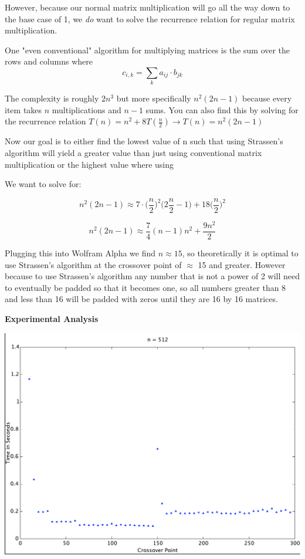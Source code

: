 \documentclass[12pt]{article}
\begin{document}
\noindent However, because our normal matrix multiplication will go all the way down to the base case of 1, we \emph{do} want to solve the recurrence relation for regular matrix multiplication.  
\medskip

\noindent One "even conventional" algorithm for multiplying matrices is the sum over the rows and columns where 
$$c_{i,k} = \sum_k a_{ij} \cdot b_{jk}$$

\noindent The complexity is roughly $2n^3$ but more specifically $n^2(2n-1)$ because every item takes $n$ multiplications and $n-1$ sums.  You can also find this by solving for the recurrence relation $T(n) = n^2 + 8T(\frac{n}{2}) \to T(n) = n^2(2n-1)$
\bigskip

\noindent Now our goal is to either find the lowest value of n such that using Strassen's algorithm will yield a greater value than just using conventional matrix multiplication or the highest value where using 
\medskip

\noindent We want to solve for:

$$n^2(2n-1) \approx 7 \cdot \bigg( \frac{n}{2}\bigg)^2\bigg(2\frac{n}{2}-1\bigg) + 18\bigg( \frac{n}{2}\bigg)^2$$

$$n^2(2n-1) \approx \frac{7}{4}(n-1)n^2 + \frac{9n^2}{2}$$

\smallskip
\noindent Plugging this into Wolfram Alpha we find $n\approx15$, so theoretically it is optimal to use Strassen's algorithm at the crossover point of $\approx$ 15 and greater.  However because to use Strassen's algorithm any number that is not a power of 2 will need to eventually be padded so that it becomes one, so all numbers greater than 8 and less than 16 will be padded with zeros until they are 16 by 16 matrices.

\bigskip

\noindent \textbf{Experimental Analysis}
\bigskip

\includegraphics[scale=0.6]{512.pdf}
\end{document}
